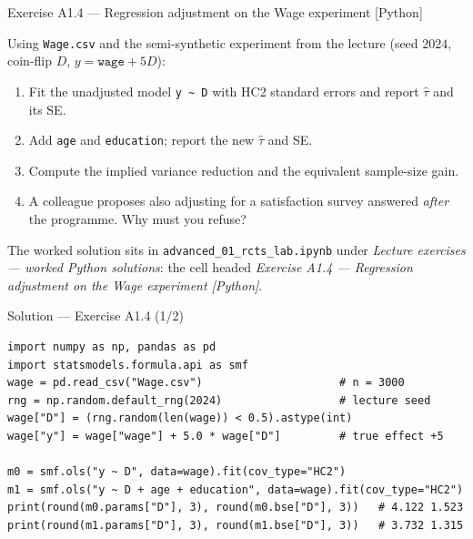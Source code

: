 \documentclass[aspectratio=169,11pt]{beamer}
\begin{document}
\begin{frame}{Exercise A1.4 --- Regression adjustment on the Wage experiment [Python]}
\begin{exercise}
  Using \texttt{Wage.csv} and the semi-synthetic experiment from the lecture
  (seed $2024$, coin-flip $D$, $y = \texttt{wage} + 5D$):
  \begin{enumerate}
    \item Fit the unadjusted model \texttt{y \~{} D} with HC2 standard errors and report
          $\hat\tau$ and its SE.
    \item Add \texttt{age} and \texttt{education}; report the new $\hat\tau$ and SE.
    \item Compute the implied variance reduction and the equivalent sample-size gain.
    \item A colleague proposes also adjusting for a satisfaction survey answered
          \emph{after} the programme. Why must you refuse?
  \end{enumerate}
\end{exercise}
\begin{labnote}
  The worked solution sits in \texttt{advanced\_01\_rcts\_lab.ipynb} under
  \emph{Lecture exercises --- worked Python solutions}: the cell headed
  \emph{Exercise A1.4 --- Regression adjustment on the Wage experiment [Python]}.
\end{labnote}
\end{frame}

\begin{frame}[fragile]{Solution --- Exercise A1.4 (1/2)}
\begin{solutionbox}
\begin{lstlisting}
import numpy as np, pandas as pd
import statsmodels.formula.api as smf
wage = pd.read_csv("Wage.csv")                     # n = 3000
rng = np.random.default_rng(2024)                  # lecture seed
wage["D"] = (rng.random(len(wage)) < 0.5).astype(int)
wage["y"] = wage["wage"] + 5.0 * wage["D"]         # true effect +5

m0 = smf.ols("y ~ D", data=wage).fit(cov_type="HC2")
m1 = smf.ols("y ~ D + age + education", data=wage).fit(cov_type="HC2")
print(round(m0.params["D"], 3), round(m0.bse["D"], 3))   # 4.122 1.523
print(round(m1.params["D"], 3), round(m1.bse["D"], 3))   # 3.732 1.315
\end{lstlisting}
\end{solutionbox}
\end{frame}
\end{document}
